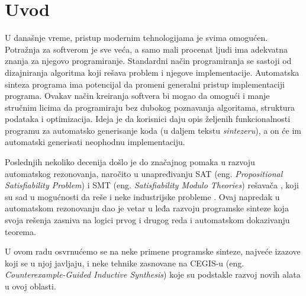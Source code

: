 \section{Uvod}
\label{sec:uvod}

U današnje vreme, pristup modernim tehnologijama je svima omogućen. Potražnja za softverom je sve veća, a samo mali procenat ljudi ima adekvatna
znanja za njegovo programiranje. Standardni način programiranja se sastoji od dizajniranja algoritma koji rešava problem i njegove implementacije. Automatska sinteza programa ima potencijal da promeni generalni pristup implementaciji programa. Ovakav način kreiranja softvera bi mogao da omogući i manje stručnim licima da programiraju bez dubokog poznavanja algoritama, struktura podataka i optimizacija.
Ideja je da korisnici daju opis željenih funkcionalnosti programu za automatsko generisanje koda (u daljem tekstu \emph{sintezeru}), a on će im automatski generisati neophodnu implementaciju.

Poslednjih nekoliko decenija došlo je do značajnog pomaka u razvoju automatskog rezonovanja, naročito u unapređivanju SAT (eng. \emph{Propositional Satisfiability Problem}) i SMT (eng. \emph{Satisfiability Modulo Theories}) rešavača \cite{SMT}, koji su sad u mogućnosti da reše i neke industrijske probleme \cite{PSE}. Ovaj napredak u automatskom rezonovanju dao je vetar u leđa razvoju programske sinteze koja svoja rešenja zasniva na logici prvog i drugog reda i automatskom dokazivanju teorema.

U ovom radu osvrnućemo se na neke primene programske sinteze, najveće izazove koji se u njoj javljaju, i neke tehnike zasnovane na CEGIS-u (eng. \emph{Counterexample-Guided Inductive Synthesis}) koje su podstakle razvoj novih alata u ovoj oblasti.
